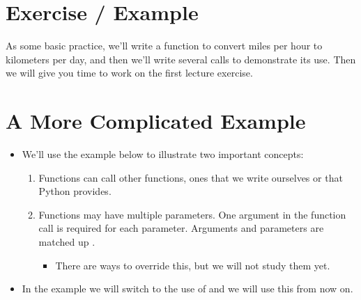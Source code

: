 \documentclass[letterpaper,10pt,english]{sphinxmanual}
\begin{document}
\section{Exercise / Example}
\label{\detokenize{lecture_notes/lec05_functions2:exercise-example}}
As some basic practice, we’ll write a function to convert miles per
hour to kilometers per day, and then we’ll write several calls to
demonstrate its use.  Then we will give you time to work on the first
lecture exercise.


\section{A More Complicated Example}
\label{\detokenize{lecture_notes/lec05_functions2:a-more-complicated-example}}\begin{itemize}
\item {} 
We’ll use the example below to illustrate two important concepts:
\begin{enumerate}
\item {} 
Functions can call other functions, ones that we write ourselves
or that Python provides.

\item {} 
Functions may have multiple parameters.  One argument in the
function call is required for each parameter. Arguments and
parameters are matched up .
\begin{itemize}
\item {} 
There are ways to override this, but we will not study them
yet.

\end{itemize}

\end{enumerate}

\item {} 
In the example we will switch to the use of  and we will
use this from now on.

\end{itemize}
\end{document}
